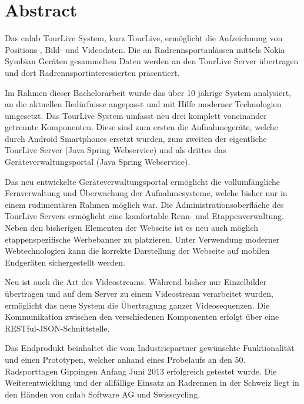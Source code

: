 \chapter*{Abstract}
Das cnlab TourLive System, kurz TourLive, ermöglicht die Aufzeichnung von Positions-, Bild- und Videodaten. Die an Radrennsportanlässen mittels Nokia Symbian Geräten gesammelten Daten werden an den TourLive Server übertragen und dort Radrennsportinteressierten präsentiert.



Im Rahmen dieser Bachelorarbeit wurde das über 10 jährige System analysiert, an die aktuellen Bedürfnisse angepasst und mit Hilfe moderner Technologien umgesetzt. Das TourLive System umfasst neu drei komplett voneinander getrennte Komponenten. Diese sind zum ersten die Aufnahmegeräte, welche durch Android Smartphones ersetzt wurden, zum zweiten der eigentliche TourLive Server (Java Spring Webservice) und als drittes das Geräteverwaltungsportal (Java Spring Webservice). 


Das neu entwickelte Geräteverwaltungsportal ermöglicht die vollumfängliche Fernverwaltung und Überwachung der Aufnahmesysteme, welche bisher nur in einem rudimentären Rahmen möglich war. Die Administrationsoberfläche des TourLive Servers ermöglicht eine komfortable Renn- und Etappenverwaltung. Neben den bisherigen Elementen der Webseite ist es neu auch möglich etappenspezifische Werbebanner zu platzieren. Unter Verwendung moderner Webtechnologien kann die korrekte  Darstellung der Webseite auf mobilen Endgeräten sichergestellt werden.


Neu ist auch die Art des Videostreams. Während bisher nur Einzelbilder übertragen und auf dem Server zu einem Videostream verarbeitet wurden, ermöglicht das neue System die Übertragung ganzer Videosequenzen. Die Kommunikation zwischen den verschiedenen Komponenten erfolgt über eine  RESTful-JSON-Schnittstelle. 


Das Endprodukt beinhaltet die vom Industriepartner gewünschte Funktionalität und einen Prototypen, welcher anhand eines Probelaufs an den 50. Radsporttagen Gippingen Anfang Juni 2013 erfolgreich getestet wurde. Die Weiterentwicklung und der allfällige Einsatz an Radrennen in der Schweiz liegt in den Händen  von cnlab Software AG und Swisscycling.